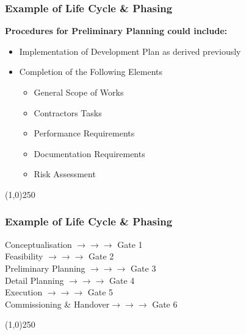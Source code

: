 \begin{frame}
\frametitle{Example of Life Cycle \& Phasing}
\textbf{Procedures for Preliminary Planning could include:}\\
\begin{itemize}
	\item Implementation of Development Plan as derived previously
	\item Completion of the Following Elements
	\begin{itemize}
		\item General Scope of Works
		\item Contractors Tasks
		\item Performance Requirements
		\item Documentation Requirements
		\item Risk Assessment
	\end{itemize}
\end{itemize}
\end{frame}
\begin{center}\line(1,0){250}\end{center}



\begin{frame}
\frametitle{Example of Life Cycle \& Phasing}
Conceptualisation \hfill$\longrightarrow\longrightarrow\longrightarrow$ Gate 1\\
Feasibility \hfill$\longrightarrow\longrightarrow\longrightarrow$ Gate 2\\
Preliminary Planning \hfill$\longrightarrow\longrightarrow\longrightarrow$ Gate 3\\
Detail Planning \hfill$\longrightarrow\longrightarrow\longrightarrow$ Gate 4\\
Execution \hfill$\longrightarrow\longrightarrow\longrightarrow$ Gate 5\\
Commissioning \& Handover\hfill$\longrightarrow\longrightarrow\longrightarrow$ Gate 6\\
\end{frame}
\begin{center}\line(1,0){250}\end{center}




